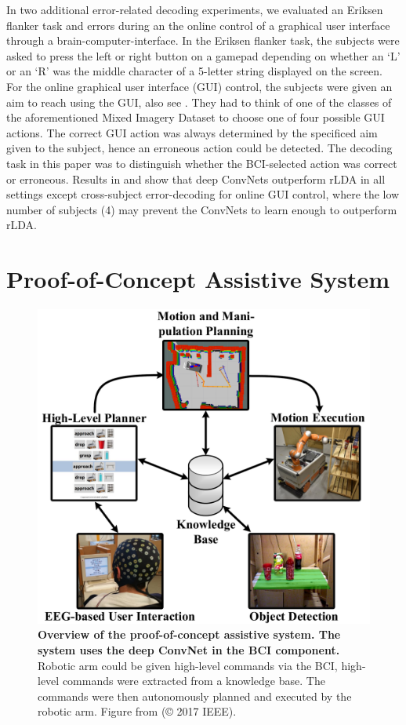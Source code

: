     In two additional error-related decoding experiments, we evaluated an
Eriksen flanker task and errors during an the online control of a
graphical user interface through a brain-computer-interface. In the
Eriksen flanker task, the subjects were asked to press the left or right
button on a gamepad depending on whether an `L' or an `R' was the middle
character of a 5-letter string displayed on the screen. For the online
graphical user interface (GUI) control, the subjects were given an aim
to reach using the GUI, also see . They had to
think of one of the classes of the aforementioned Mixed Imagery Dataset
to choose one of four possible GUI actions. The correct GUI action was
always determined by the specificed aim given to the subject, hence an
erroneous action could be detected. The decoding task in this paper was
to distinguish whether the BCI-selected action was correct or erroneous.
Results in  and
 show that deep ConvNets
outperform rLDA in all settings except cross-subject error-decoding for
online GUI control, where the low number of subjects (4) may prevent the
ConvNets to learn enough to outperform rLDA.

\section{Proof-of-Concept Assistive
System}\label{online-bci}


\begin{figure}[htb]
    \myfloatalign
    \includegraphics[width=0.5\linewidth]{images/robot-bci-overview.png}
    \caption[Overview of the proof-of-concept assistive system]{
\textbf{Overview of the proof-of-concept assistive system. The system
uses the deep ConvNet in the BCI component.} Robotic arm could be given high-level commands via the BCI, high-level commands were extracted from a knowledge base. The commands were then autonomously planned and executed by the robotic arm. Figure
from \citet{burget2017acting} (© 2017 IEEE).
}
\label{robot-bci-overview-fig}
\end{figure}



